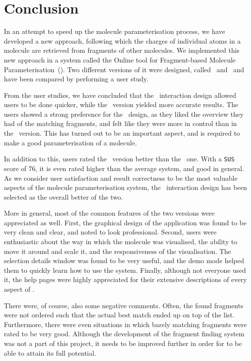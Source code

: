 \chapter{Conclusion}

In an attempt to speed up the molecule parameterisation process, we have developed a new approach, following which the charges of individual atoms in a molecule are retrieved from fragments of other molecules. We implemented this new approach in a system called the Online tool for Fragment-based Molecule Parameterisation~(\oframp). Two different versions of it were designed, called \IDa\ and \IDb\, and have been compared by performing a user study.

From the user studies, we have concluded that the \IDb\ interaction design allowed users to be done quicker, while the \IDa\ version yielded more accurate results. The users showed a strong preference for the \IDa\ design, as they liked the overview they had of the matching fragments, and felt like they were more in control than in the \IDb\ version. This has turned out to be an important aspect, and is required to make a good parameterisation of a molecule.

In addition to this, users rated the \IDa\ version better than the \IDb\ one. With a \verb|SUS| score of 76, it is even rated higher than the average system, and good in general. As we consider user satisfaction and result correctness to be the most valuable aspects of the molecule parameterisation system, the \IDa\ interaction design has been selected as the overall better of the two.

More in general, most of the common features of the two versions were appreciated as well. First, the graphical design of the application was found to be very clean and clear, and noted to look professional. Second, users were enthusiastic about the way in which the molecule was visualised, the ability to move it around and scale it, and the responsiveness of the visualisation. The selection details window was found to be very useful, and the demo mode helped them to quickly learn how to use the system. Finally, although not everyone used it, the help pages were highly appreciated for their extensive descriptions of every aspect of \oframp.

There were, of course, also some negative comments. Often, the found fragments were not ordered such that the actual best match ended up on top of the list. Furthermore, there were even situations in which barely matching fragments were rated to be very good. Although the development of the fragment finding system was not a part of this project, it needs to be improved further in order for \oframp{} to be able to attain its full potential.

